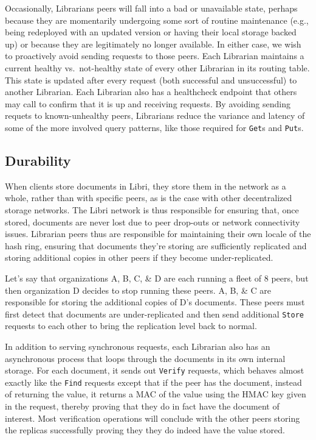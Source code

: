 \documentclass[10pt]{article}
\newcommand{\ttt}[1]{\texttt{#1}}
\begin{document}
Occasionally, Librarians peers will fall into a bad or unavailable state, perhaps because they are momentarily undergoing some sort of routine maintenance (e.g., being redeployed with an updated version or having their local storage backed up) or because they are legitimately no longer available. In either case, we wish to proactively avoid sending requests to those peers. Each Librarian maintains a current healthy vs.\ not-healthy state of every other Librarian in its routing table. This state is updated after every request (both successful and unsuccessful) to another Librarian. Each Librarian also has a healthcheck endpoint that others may call to confirm that it is up and receiving requests. By avoiding sending requets to known-unhealthy peers, Librarians reduce the variance and latency of some of the more involved query patterns, like those required for \ttt{Get}s and \texttt{Put}s.

\subsection{Durability}
When clients store documents in Libri, they store them in the network as a whole, rather than with specific peers, as is the case with other decentralized storage networks\cite{bittorrent-review,ipfs}. The Libri network is thus responsible for ensuring that, once stored, documents are never lost due to peer drop-outs or network connectivity issues. Librarian peers thus are responsible for maintaining their own locale of the hash ring, ensuring that documents they're storing are sufficiently replicated and storing additional copies in other peers if they become under-replicated. 

Let's say that organizations A, B, C, \& D are each running a fleet of 8 peers, but then organization D decides to stop running these peers. A, B, \& C are responsible for storing the additional copies of D's documents. These peers must first detect that documents are under-replicated and then send additional \ttt{Store} requests to each other to bring the replication level back to normal. 

In addition to serving synchronous requests, each Librarian also has an asynchronous process that loops through the documents in its own internal storage. For each document, it sends out \ttt{Verify} requests, which behaves almost exactly like the \texttt{Find} requests except that if the peer has the document, instead of returning the value, it returns a MAC of the value using the HMAC key given in the request, thereby proving that they do in fact have the document of interest. Most verification operations will conclude with the other peers storing the replicas successfully proving they they do indeed have the value stored. 
\end{document}
